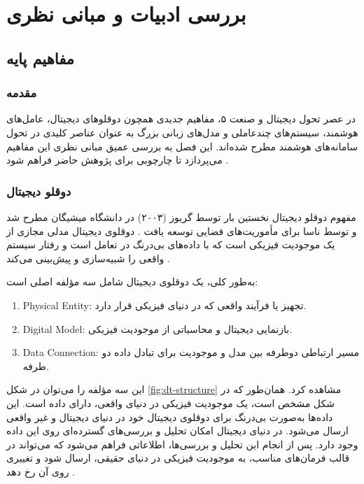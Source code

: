 \chapter{بررسی ادبیات و مبانی نظری}\label{chap:review}

\section{مفاهیم پایه}\label{chap:brain}

\subsection{مقدمه}

در عصر تحول دیجیتال و صنعت ۵، مفاهیم جدیدی همچون دوقلوهای دیجیتال، عامل‌های هوشمند، سیستم‌های چندعاملی و مدل‌های زبانی بزرگ به عنوان عناصر کلیدی در تحول سامانه‌های هوشمند مطرح شده‌اند. این فصل به بررسی عمیق مبانی نظری این مفاهیم می‌پردازد تا چارچوبی برای پژوهش حاضر فراهم شود \cite{barricelli2019survey,tao2019digital,grieves2017digital}.

\subsection{دوقلو دیجیتال}

مفهوم دوقلو دیجیتال نخستین بار توسط گریوز (۲۰۰۳) در دانشگاه میشیگان مطرح شد و توسط ناسا برای مأموریت‌های فضایی توسعه یافت \cite{grieves2017digital}. دوقلوی دیجیتال مدلی مجازی از یک موجودیت فیزیکی است که با داده‌های بی‌درنگ در تعامل است و رفتار سیستم واقعی را شبیه‌سازی و پیش‌بینی می‌کند \cite{barricelli2019survey,qi2021digital,jiang2023digital}. 

به‌طور کلی، یک دوقلوی دیجیتال شامل سه مؤلفه اصلی است:
\begin{enumerate}
	\item \gls{Physical Entity}: تجهیز یا فرآیند واقعی که در دنیای فیزیکی قرار دارد.
	\item \gls{Digital Model}: بازنمایی دیجیتال و محاسباتی از موجودیت فیزیکی.
	\item \gls{Data Connection}: مسیر ارتباطی دوطرفه بین مدل و موجودیت برای تبادل داده دو طرفه.
\end{enumerate}

این سه مؤلفه را می‌توان در شکل \ref{fig:dt-structure} مشاهده کرد. همان‌طور که در شکل مشخص است، یک موجودیت فیزیکی در دنیای واقعی، دارای داده است. این داده‌ها به‌صورت بی‌درنگ برای دوقلوی دیجیتال خود در دنیای دیجیتال و غیر واقعی ارسال می‌شود. در دنیای دیجیتال امکان تحلیل و بررسی‌های گسترده‌ای روی این داده وجود دارد. پس از انجام این تحلیل و بررسی‌ها، اطلاعاتی فراهم می‌شود که می‌تواند در قالب فرمان‌های مناسب، به موجودیت فیزیکی در دنیای حقیقی، ارسال شود و تغییری روی آن رخ دهد \cite{lopez2024madtwin}.


